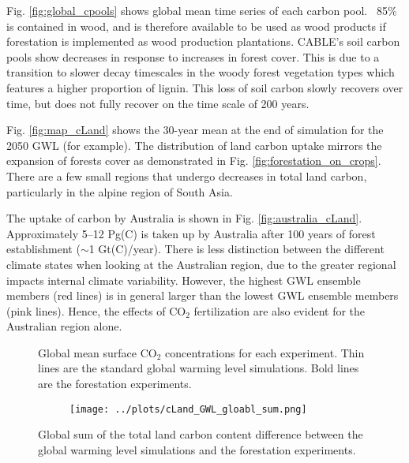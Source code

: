 \documentclass[]{article}
\begin{document}
Fig. \ref{fig:global_cpools} shows global mean time series of each carbon pool.
~85\% is contained in wood, and is therefore available to be used as wood products if forestation is implemented as wood production plantations.
CABLE's soil carbon pools show decreases in response to increases in forest cover.
This is due to a transition to slower decay timescales in the woody forest vegetation types which features a higher proportion of lignin.
This loss of soil carbon slowly recovers over time, but does not fully recover on the time scale of 200 years. 

Fig. \ref{fig:map_cLand} shows the 30-year mean at the end of simulation for the 2050 GWL (for example).
The distribution of land carbon uptake mirrors the expansion of forests cover as demonstrated in Fig. \ref{fig:forestation_on_crops}.
There are a few small regions that undergo decreases in total land carbon, particularly in the alpine region of South Asia.

The uptake of carbon by Australia is shown in Fig. \ref{fig:australia_cLand}.
Approximately 5–12 Pg(C) is taken up by Australia after 100 years of forest establishment ($\sim$1 Gt(C)/year).
There is less distinction between the different climate states when looking at the Australian region, due to the greater regional impacts internal climate variability.
However, the highest GWL ensemble members (red lines) is in general larger than the lowest GWL ensemble members (pink lines).
Hence, the effects of CO$_2$ fertilization are also evident for the Australian region alone.

\begin{figure}[H]
    \centering
    \begin{subfigure}[b]{\linewidth}
        
    \end{subfigure}
    \caption{Global mean surface CO$_2$ concentrations for each experiment. Thin lines are the standard global warming level simulations. Bold lines are the forestation experiments.}
    \label{fig:global_co2}
\end{figure}

\begin{figure}[H]
    \centering
    \begin{subfigure}[b]{\linewidth}
        \texttt{[image: ../plots/cLand\_GWL\_gloabl\_sum.png]}
    \end{subfigure}
    \caption{Global sum of the total land carbon content difference between the global warming level simulations and the forestation experiments.}
    \label{fig:global_cLand}
\end{figure}
\end{document}
